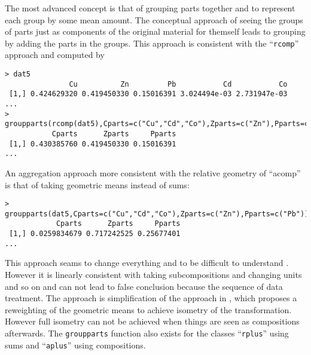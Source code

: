 \documentclass{article}
\newcommand{\code}[1]{{\tt #1}}
\begin{document}
The most advanced concept is that of grouping parts together and to represent
each group by some mean amount. The conceptual approach of seeing the groups
of parts just as components of the original material for themself leads to
grouping by adding the parts in the groups. This approach is consistent with
the ``\code{rcomp}'' approach and computed by
\begin{verbatim}
> dat5
               Cu          Zn         Pb           Cd           Co
 [1,] 0.424629320 0.419450330 0.15016391 3.024494e-03 2.731947e-03
...
> groupparts(rcomp(dat5),Cparts=c("Cu","Cd","Co"),Zparts=c("Zn"),Pparts=c("Pb"))
           Cparts      Zparts     Pparts
 [1,] 0.430385760 0.419450330 0.15016391
... 
\end{verbatim}
An aggregation approach more consistent with the relative geometry of
``acomp'' is that of taking geometric means instead of sums:
\begin{verbatim}
> groupparts(dat5,Cparts=c("Cu","Cd","Co"),Zparts=c("Zn"),Pparts=c("Pb"))
            Cparts      Zparts     Pparts
 [1,] 0.0259834679 0.717242525 0.25677401
...
\end{verbatim} 
This approach seams to change everything and to be difficult to understand .
However it is linearly consistent with taking subcompositions and changing
units and so on and can not lead to false conclusion because the sequence of
data treatment. The approach is simplification of the approach in
\cite{EPG05}, which proposes a reweighting of the geometric means to achieve
isometry of the transformation. However full isometry can not be achieved when
things are seen as compositions afterwards. The \code{groupparts} function also exists for the
classes ``\code{rplus}'' using sums and ``\code{aplus}'' using compositions.
\end{document}
